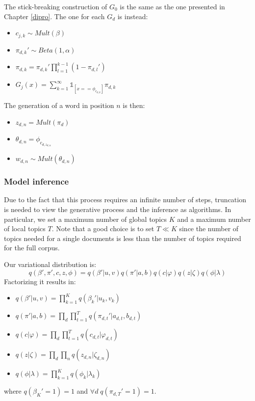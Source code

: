 The stick-breaking construction of $G_0$ is the same as the one presented in Chapter \ref{dipro}.
The one for each $G_d$ is instead:
\begin{itemize}
    \item $c_{j,k} \sim \mathit{Mult}(\beta)$
    \item $\pi_{d,k}' \sim \mathit{Beta(1, \alpha)}$
    \item $\pi_{d,k} = \pi_{d,k}' \prod_{l=1}^{k-1} (1 - \pi_{d,l}')$
    \item $G_j(x) = \sum_{k=1}^{\infty} \mathbb{1}_{[x == \phi_{c_{d,k}}]} \pi_{d,k}$
\end{itemize}

The generation of a word in position $n$ is then:
\begin{itemize}
    \item $z_{d,n} = \mathit{Mult}(\pi_d)$
    \item $\theta_{d,n} = \phi_{c_{d,z_{d,n}}}$
    \item $w_{d,n} \sim \mathit{Mult}(\theta_{d,n})$
\end{itemize}

\subsubsection{Model inference}
Due to the fact that this process requires an infinite number of steps,
truncation is needed to view the generative process and the inference as algorithms.
In particular, we set a maximum number of global topics $K$ and a maximum number of local topics $T$.
Note that a good choice is to set $T \ll K$ since the number of topics needed for a single documents is
less than the number of topics required for the full corpus.

Our variational distribution is:
\begin{equation*}
    q(\beta', \pi', c, z, \phi) = q(\beta' | u, v) q(\pi' | a, b) q(c | \varphi) q(z | \zeta) q(\phi | \lambda)
\end{equation*}
Factorizing it results in:
\begin{itemize}
    \item $q(\beta' | u, v) = \prod_{k=1}^K q(\beta_k' | u_k, v_k)$
    \item $q(\pi' | a, b) = \prod_d \prod_{t=1}^T q(\pi_{d,t}' | a_{d,t}, b_{d,t})$
    \item $q(c | \varphi) = \prod_d \prod_{t=1}^T q(c_{d,t} | \varphi_{d,t})$
    \item $q(z | \zeta) = \prod_d \prod_n q(z_{d,n} | \zeta_{d,n})$
    \item $q(\phi | \lambda) = \prod_{k=1}^{K} q(\phi_k | \lambda_k)$
\end{itemize}
where $q(\beta_K' = 1) = 1$ and $\forall d \; q(\pi_{d,T}' = 1) = 1$.


